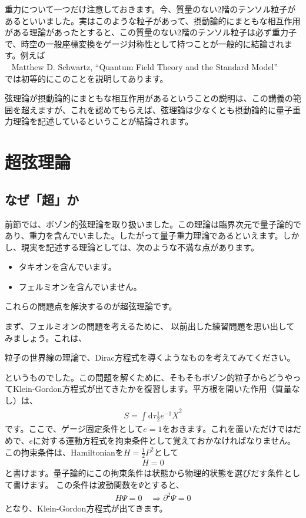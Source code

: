 \documentclass[report,paper=a4, fontsize=12pt, line_length=16cm, number_of_lines=33,dvipdfmx]{jlreq}
\newenvironment{myquote}{\begin{tcolorbox}[
  colback = blue!5, after = \noindent] }{\end{tcolorbox}}
\newenvironment{mycite}{\\ \qquad \textbullet\ }{\\}
\numberwithin{equation}{chapter}
\numberwithin{equation}{section}
\newcommand{\del}{\partial}
\newcommand{\di}{\mathrm{d}}
\begin{document}
重力について一つだけ注意しておきます。今、質量のない2階のテンソル粒子があるといいました。実はこのような粒子があって、摂動論的にまともな相互作用がある理論があったとすると、この質量のない2階のテンソル粒子は必ず重力子で、時空の一般座標変換をゲージ対称性として持つことが一般的に結論されます。例えば
\begin{mycite}
  Matthew D. Schwartz, ``Quantum Field Theory and the Standard Model''
\end{mycite}
では初等的にこのことを説明してあります。

弦理論が摂動論的にまともな相互作用があるということの説明は、この講義の範囲を超えますが、これを認めてもらえば、弦理論は少なくとも摂動論的に量子重力理論を記述しているということが結論されます。

\chapter{超弦理論}

\section{なぜ「超」か}
前節では、ボゾン的弦理論を取り扱いました。この理論は臨界次元で量子論的であり、重力を含んでいました。したがって量子重力理論であるといえます。しかし、現実を記述する理論としては、次のような不満な点があります。
\begin{itemize}
\item タキオンを含んでいます。
\item フェルミオンを含んでいません。
\end{itemize}
これらの問題点を解決するのが超弦理論です。

まず、フェルミオンの問題を考えるために、
以前出した練習問題を思い出してみましょう。これは、
\begin{myquote}
粒子の世界線の理論で、Dirac方程式を導くようなものを考えてみてください。
\end{myquote}
というものでした。この問題を解くために、そもそもボゾン的粒子からどうやってKlein-Gordon方程式が出てきたかを復習します。平方根を開いた作用（質量なし）は、
\begin{align}
S=\int \di\tau \frac12 e^{-1} \dot{X}^2
\end{align}
です。ここで、ゲージ固定条件として$e=1$をおきます。これを置いただけではだめで、$e$に対する運動方程式を拘束条件として覚えておかなければなりません。この拘束条件は、Hamiltonianを$H=\frac12 P^2$として
\begin{align}
H=0
\end{align}
と書けます。量子論的にこの拘束条件は状態から物理的状態を選びだす条件として書けます。
この条件は波動関数を$\Psi$とすると、
\begin{align}
H\Psi=0 \quad \Rightarrow \del^2 \Psi =0
\end{align}
となり、Klein-Gordon方程式が出てきます。
\end{document}
